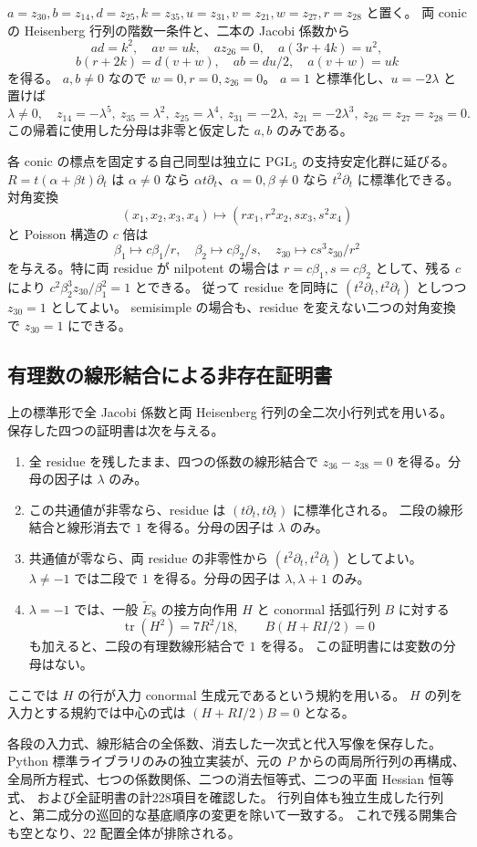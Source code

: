 $a=z_{30},b=z_{14},d=z_{25},k=z_{35},u=z_{31},v=z_{21},w=z_{27},r=z_{28}$ と置く。
両 conic の Heisenberg 行列の階数一条件と、二本の Jacobi 係数から
\[
ad=k^2,\quad av=uk,\quad a z_{26}=0,\quad a(3r+4k)=u^2,
\]
\[
b(r+2k)=d(v+w),\quad ab=du/2,\quad a(v+w)=uk
\]
を得る。
$a,b\ne0$ なので $w=0,r=0,z_{26}=0$。
$a=1$ と標準化し、$u=-2\lambda$ と置けば
\[
\lambda\ne0,\quad
z_{14}=-\lambda^5,\ z_{35}=\lambda^2,\ z_{25}=\lambda^4,\
z_{31}=-2\lambda,\ z_{21}=-2\lambda^3,\ z_{26}=z_{27}=z_{28}=0.
\]
この帰着に使用した分母は非零と仮定した $a,b$ のみである。

各 conic の標点を固定する自己同型は独立に $\mathrm{PGL}_5$ の支持安定化群に延びる。
$R=t(\alpha+\beta t)\partial_t$ は $\alpha\ne0$ なら
$\alpha t\partial_t$、$\alpha=0,\beta\ne0$ なら $t^2\partial_t$ に標準化できる。
対角変換
\[
(x_1,x_2,x_3,x_4)\mapsto(rx_1,r^2x_2,sx_3,s^2x_4)
\]
と Poisson 構造の $c$ 倍は
\[
\beta_1\mapsto c\beta_1/r,\quad
\beta_2\mapsto c\beta_2/s,\quad
z_{30}\mapsto cs^3z_{30}/r^2
\]
を与える。特に両 residue が nilpotent の場合は
$r=c\beta_1,s=c\beta_2$ として、残る $c$ により
$c^2\beta_2^3z_{30}/\beta_1^2=1$ とできる。
従って residue を同時に $(t^2\partial_t,t^2\partial_t)$ としつつ $z_{30}=1$ としてよい。
semisimple の場合も、residue を変えない二つの対角変換で $z_{30}=1$ にできる。

\subsection{有理数の線形結合による非存在証明書}

上の標準形で全 Jacobi 係数と両 Heisenberg 行列の全二次小行列式を用いる。
保存した四つの証明書は次を与える。
\begin{enumerate}
\item 全 residue を残したまま、四つの係数の線形結合で
$z_{36}-z_{38}=0$ を得る。分母の因子は $\lambda$ のみ。
\item この共通値が非零なら、residue は $(t\partial_t,t\partial_t)$ に標準化される。
二段の線形結合と線形消去で $1$ を得る。分母の因子は $\lambda$ のみ。
\item 共通値が零なら、両 residue の非零性から
$(t^2\partial_t,t^2\partial_t)$ としてよい。
$\lambda\ne-1$ では二段で $1$ を得る。分母の因子は $\lambda,\lambda+1$ のみ。
\item $\lambda=-1$ では、一般 $\widetilde E_8$ の接方向作用 $H$ と
conormal 括弧行列 $B$ に対する
\[
\operatorname{tr}(H^2)=7R^2/18,\qquad B(H+R I/2)=0
\]
も加えると、二段の有理数線形結合で $1$ を得る。
この証明書には変数の分母はない。
\end{enumerate}
ここでは $H$ の行が入力 conormal 生成元であるという規約を用いる。
$H$ の列を入力とする規約では中心の式は $(H+RI/2)B=0$ となる。

各段の入力式、線形結合の全係数、消去した一次式と代入写像を保存した。
Python 標準ライブラリのみの独立実装が、元の $P$ からの両局所行列の再構成、
全局所方程式、七つの係数関係、二つの消去恒等式、二つの平面 Hessian 恒等式、
および全証明書の計228項目を確認した。
行列自体も独立生成した行列と、第二成分の巡回的な基底順序の変更を除いて一致する。
これで残る開集合も空となり、$22$ 配置全体が排除される。
